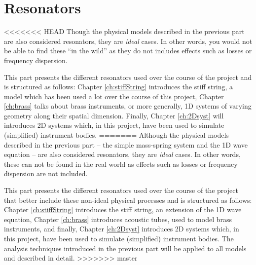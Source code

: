 \chapter*{Resonators}
<<<<<<< HEAD
Though the physical models described in the previous part are also considered resonators, they are \textit{ideal} cases. In other words, you would not be able to find these ``in the wild'' as they do not includes effects such as losses or frequency dispersion. 

This part presents the different resonators used over the course of the project and is structured as follows: Chapter \ref{ch:stiffString} introduces the stiff string, a model which has been used a lot over the course of this project, Chapter \ref{ch:brass} talks about brass instruments, or more generally, 1D systems of varying geometry along their spatial dimension. Finally, Chapter \ref{ch:2Dsyst} will introduces 2D systems which, in this project, have been used to simulate (simplified) instrument bodies.
=======
Although the physical models described in the previous part -- the simple mass-spring system and the 1D wave equation -- are also considered resonators, they are \textit{ideal} cases. In other words, these can not be found in the real world as effects such as losses or frequency dispersion are not included. 

This part presents the different resonators used over the course of the project that better include these non-ideal physical processes and is structured as follows: Chapter \ref{ch:stiffString} introduces the stiff string, an extension of the 1D wave equation, %
Chapter \ref{ch:brass} introduces acoustic tubes, used to model brass instruments, and finally, Chapter \ref{ch:2Dsyst} introduces 2D systems which, in this project, have been used to simulate (simplified) instrument bodies. The analysis techniques introduced in the previous part will be applied to all models and described in detail. 
>>>>>>> master
